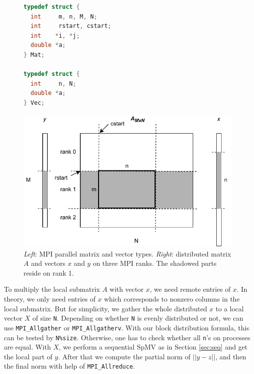 \documentclass[creativecommons]{eptcs}
\begin{document}
\begin{figure}[h]
\begin{minipage}{0.35\textwidth}
\begin{lstlisting}[language=C]
typedef struct {
  int     m, n, M, N;
  int     rstart, cstart;
  int    *i, *j;
  double *a;
} Mat;

typedef struct {
  int     n, N;
  double *a;
} Vec;
\end{lstlisting}
\end{minipage}
\hfill
\begin{minipage}{0.60\textwidth}
    \includegraphics[width=1.0\textwidth]{figs/MPICSR.pdf}
\end{minipage}
\caption{{\it Left}: MPI parallel matrix and vector types.
{\it Right}: distributed matrix $A$ and vectors $x$ and $y$ on three MPI ranks.
The shadowed parts reside on rank 1.}
\label{fig:mpicsr}
\end{figure}


To multiply the local submatrix $A$ with vector $x$, we need remote entries of $x$. In theory, we only
need entries of $x$ which corresponds to nonzero columns in the local submatrix. But for simplicity,
we gather the whole distributed $x$ to a local vector $X$ of size {\tt N}.
Depending on whether {\tt N} is evenly distributed or not, we can use {\tt MPI_Allgather} or {\tt MPI_Allgatherv}.
With our block distribution formula, this can be tested by {\tt N\%size}. Otherwise,
one has to check whether all {\tt n}'s on processes are equal.
With $X$, we perform a sequential SpMV as in Section \ref{sec:seq} and get the local part of
$y$. After that we compute the partial norm of $||y - z||$, and
then the final norm with help of {\tt MPI_Allreduce}.
\end{document}
